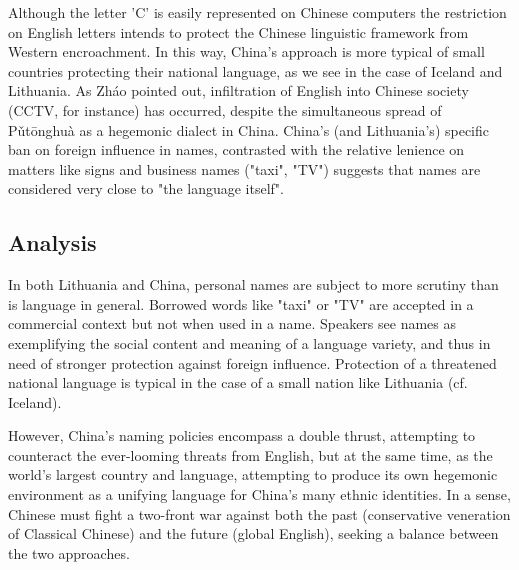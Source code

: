 Although the letter 'C' is easily represented on Chinese computers the
restriction on English letters intends to protect the Chinese linguistic
framework from Western encroachment. In this way, China's approach is more
typical of small countries protecting their national language, as we see in the
case of Iceland and Lithuania. As Zháo pointed out, infiltration of English into
Chinese society (CCTV, for instance) has occurred, despite the simultaneous
spread of Pǔtōnghuà as a hegemonic dialect in China. China's (and Lithuania's)
specific ban on foreign influence in names, contrasted with the relative
lenience on matters like signs and business names ("taxi", "TV") suggests that
names are considered very close to "the language itself".

\subsection{Analysis}

In both Lithuania and China, personal names are subject to more scrutiny than
is language in general. Borrowed words like "taxi" or "TV" are accepted in a
commercial context but not when used in a name. Speakers see names as
exemplifying the social content and meaning of a language variety, and thus in
need of stronger protection against foreign influence. Protection of a
threatened national language is typical in the case of a small nation like
Lithuania (cf. Iceland).

However, China's naming policies encompass a double thrust, attempting to
counteract the ever-looming threats from English, but at the same time, as the
world's largest country and language, attempting to produce its own hegemonic
environment as a unifying language for China's many ethnic identities. In a
sense, Chinese must fight a two-front war against both the past (conservative
veneration of Classical Chinese) and the future (global English), seeking a
balance between the two approaches.
